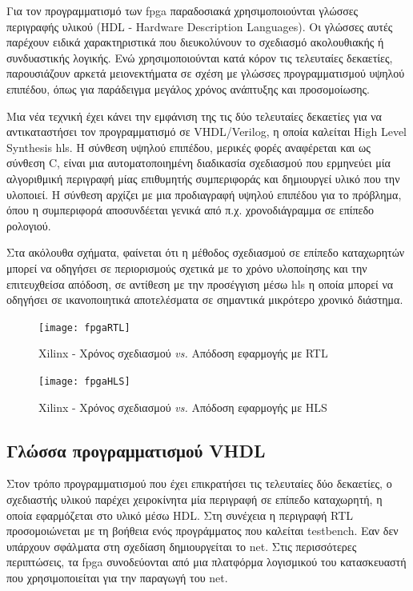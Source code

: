 Για τον προγραμματισμό των \gls{fpga} παραδοσιακά χρησιμοποιούνται γλώσσες περιγραφής υλικού (HDL - Hardware Description Languages). Οι γλώσσες αυτές παρέχουν ειδικά χαρακτηριστικά που διευκολύνουν το σχεδιασμό ακολουθιακής ή συνδυαστικής λογικής. Ενώ χρησιμοποιούνται κατά κόρον τις τελευταίες δεκαετίες, παρουσιάζουν αρκετά μειονεκτήματα σε σχέση με γλώσσες προγραμματισμού υψηλού επιπέδου, όπως για παράδειγμα μεγάλος χρόνος ανάπτυξης και προσομοίωσης.

Μια νέα τεχνική έχει κάνει την εμφάνιση της τις δύο τελευταίες δεκαετίες για να αντικαταστήσει τον προγραμματισμό σε VHDL/Verilog, η οποία καλείται High Level Synthesis \gls{hls}. Η σύνθεση υψηλού επιπέδου, μερικές φορές αναφέρεται και ως σύνθεση C, είναι μια αυτοματοποιημένη διαδικασία σχεδιασμού που ερμηνεύει μία αλγοριθμική περιγραφή μίας επιθυμητής συμπεριφοράς και δημιουργεί υλικό που την υλοποιεί. Η σύνθεση αρχίζει με μια προδιαγραφή υψηλού επιπέδου για το πρόβλημα, όπου η συμπεριφορά αποσυνδέεται γενικά από π.χ. χρονοδιάγραμμα σε επίπεδο ρολογιού.

Στα ακόλουθα σχήματα, φαίνεται ότι η μέθοδος σχεδιασμού σε επίπεδο καταχωρητών μπορεί να οδηγήσει σε περιορισμούς σχετικά με το χρόνο υλοποίησης και την επιτευχθείσα απόδοση, σε αντίθεση με την προσέγγιση μέσω \gls{hls} η οποία μπορεί να οδηγήσει σε ικανοποιητικά αποτελέσματα σε σημαντικά μικρότερο χρονικό διάστημα.
\begin{figure}[H]
  	\centering
	\texttt{[image: fpgaRTL]}
	\caption{Xilinx - Χρόνος σχεδιασμού \emph{vs. } Απόδοση εφαρμογής με RTL \cite{ug998}}
	\label{fig:fpgartl}
\end{figure}
\begin{figure}[H]
  	\centering
	\texttt{[image: fpgaHLS]}
	\caption{Xilinx - Χρόνος σχεδιασμού \emph{vs. } Απόδοση εφαρμογής με HLS \cite{ug998}}
	\label{fig:fpgahls}
\end{figure}
\subsection{Γλώσσα προγραμματισμού VHDL}

Στον τρόπο προγραμματισμού που έχει επικρατήσει τις τελευταίες δύο δεκαετίες, ο σχεδιαστής υλικού παρέχει χειροκίνητα μία περιγραφή σε επίπεδο καταχωρητή, η οποία εφαρμόζεται στο υλικό μέσω HDL. Στη συνέχεια η περιγραφή RTL προσομοιώνεται με τη βοήθεια ενός προγράμματος που καλείται testbench. Εαν δεν υπάρχουν σφάλματα στη σχεδίαση δημιουργείται το \gls{net}. Στις περισσότερες περιπτώσεις, τα \gls{fpga} συνοδεύονται από μια πλατφόρμα λογισμικού του κατασκευαστή που χρησιμοποιείται για την παραγωγή του \gls{net}.

